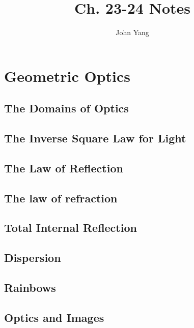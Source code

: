 \documentclass[twocolumn]{article}
\title{Ch. 23-24 Notes}
\author{John Yang}
\begin{document}
\maketitle
\section{Geometric Optics}
\subsection{The Domains of Optics}
\begin{outline}
\1 
\end{outline}
\subsection{The Inverse Square Law for Light}
\begin{outline}
\1 
\end{outline}
\subsection{The Law of Reflection}
\begin{outline}
\1 
\end{outline}
\subsection{The law of refraction}
\begin{outline}
\1 
\end{outline}
\subsection{Total Internal Reflection}
\begin{outline}
\1 
\end{outline}
\subsection{Dispersion}
\begin{outline}
\1 
\end{outline}
\subsection{Rainbows}
\begin{outline}
\1 
\end{outline}
\subsection{Optics and Images}
\begin{outline}
\1 
\end{outline}
\end{document}
